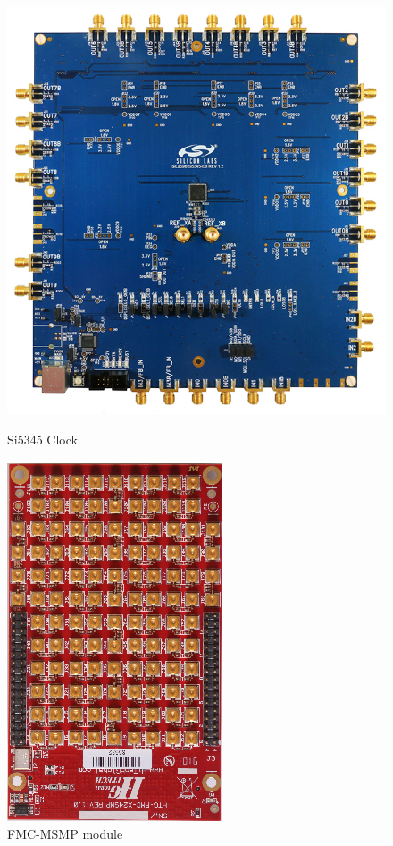 \begin{figure}[ht]
    \centering

    \begin{minipage}[b]{0.6\textwidth}
        \includegraphics[width=0.8\linewidth]{img/clock.jpg}
        \caption{Si5345 Clock}%
        \label{fig:clock}
    \end{minipage}
    \hfill
    \begin{minipage}[b]{0.3\textwidth}
        \includegraphics[width=0.8\linewidth]{img/fmc.png}
        \caption{FMC-MSMP module}%
        \label{fig:fmc}
    \end{minipage}


\end{figure}
